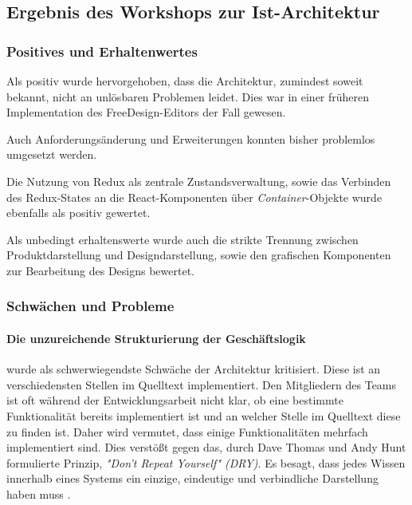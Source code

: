 \subsection{Ergebnis des Workshops zur Ist-Architektur}

\subsubsection{Positives und Erhaltenwertes}
Als positiv wurde hervorgehoben, dass die Architektur, zumindest soweit bekannt, nicht an unlösbaren Problemen leidet. 
Dies war in einer früheren Implementation des FreeDesign-Editors der Fall gewesen.

Auch Anforderungsänderung und Erweiterungen konnten bisher problemlos umgesetzt werden.

Die Nutzung von Redux als zentrale Zustandsverwaltung, sowie das Verbinden des Redux-States an die React-Komponenten über \emph{Container}-Objekte wurde ebenfalls als positiv gewertet. 

Als unbedingt erhaltenswerte wurde auch die strikte Trennung zwischen Produktdarstellung und Designdarstellung, sowie den grafischen Komponenten zur Bearbeitung des Designs bewertet. 


\subsubsection{Schwächen und Probleme}
\paragraph{Die unzureichende Strukturierung der Geschäftslogik}
wurde als schwerwiegendste Schwäche der Architektur kritisiert.
Diese ist an verschiedensten Stellen im Quelltext implementiert. Den Mitgliedern des Teams ist oft während der Entwicklungsarbeit nicht klar, ob eine bestimmte Funktionalität bereits implementiert ist und an welcher Stelle im Quelltext diese zu finden ist. 
Daher wird vermutet, dass einige Funktionalitäten mehrfach implementiert sind. 
Dies verstößt gegen das, durch Dave Thomas und Andy Hunt formulierte Prinzip, \emph{"Don’t Repeat Yourself" (DRY)}. Es besagt, dass jedes Wissen innerhalb eines Systems ein einzige, eindeutige und verbindliche Darstellung haben muss \autocite[vgl.][30 - 31]{ThomasAndHunt2020}. 

